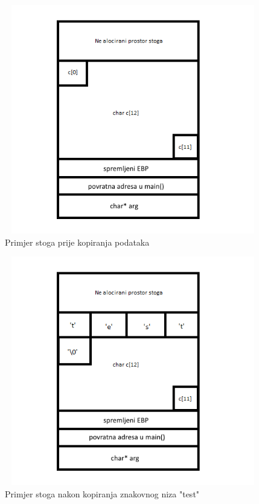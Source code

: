 \documentclass[times, utf8, diplomski, numeric]{fer}
\begin{document}
\begin{figure}[!ht]
\centering
\setlength\fboxsep{0pt}
\setlength\fboxrule{0.5pt}
\includegraphics[width=12cm, height=10cm]{slike/buffer_overflow_nodata}
\caption{Primjer stoga prije kopiranja podataka}
\label{fig:buff_overflow_nodata} 
\end{figure} 

\begin{figure}[!ht]
\centering
\setlength\fboxsep{0pt}
\setlength\fboxrule{0.5pt}
\includegraphics[width=12cm, height=10cm]{slike/buffer_overflow_legitdata}
\caption{Primjer stoga nakon kopiranja znakovnog niza "test"}
\label{fig:buff_overflow_legitdata} 
\end{figure} 
\end{document}
